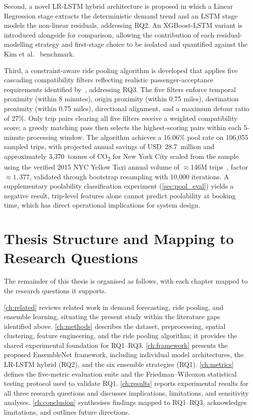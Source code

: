 Second, a novel LR-LSTM hybrid architecture is proposed in which a Linear Regression stage extracts the deterministic demand trend and an LSTM stage models the non-linear residuals, addressing RQ2. An XGBoost-LSTM variant is introduced alongside for comparison, allowing the contribution of each residual-modelling strategy and first-stage choice to be isolated and quantified against the Kim et al.~\parencite{kim2020hybrid} benchmark.

Third, a constraint-aware ride pooling algorithm is developed that applies five cascading compatibility filters reflecting realistic passenger-acceptance requirements identified by~\parencite{furuhata2013ridesharing}, addressing RQ3. The five filters enforce temporal proximity (within 8 minutes), origin proximity (within 0.75 miles), destination proximity (within 0.75 miles), directional alignment, and a maximum detour ratio of 27\%. Only trip pairs clearing all five filters receive a weighted compatibility score; a greedy matching pass then selects the highest-scoring pairs within each 5-minute processing window. The algorithm achieves a 16.06\% pool rate on 106,055 sampled trips, with projected annual savings of USD~28.7~million and approximately 3{,}370~tonnes of CO\textsubscript{2} for New York City scaled from the sample using the verified 2015 NYC Yellow Taxi annual volume of $\approx$146M trips~\parencite{nyc_opendata_2015}, factor $\approx 1{,}377$, validated through bootstrap resampling with 10,000 iterations. A supplementary poolability classification experiment (\autoref{sec:pool_eval}) yields a negative result, trip-level features alone cannot predict poolability at booking time, which has direct operational implications for system design.

\section{Thesis Structure and Mapping to Research Questions}

The remainder of this thesis is organised as follows, with each chapter mapped to the research questions it supports.

\autoref{ch:related} reviews related work in demand forecasting, ride pooling, and ensemble learning, situating the present study within the literature gaps identified above. \autoref{ch:methods} describes the dataset, preprocessing, spatial clustering, feature engineering, and the ride pooling algorithm; it provides the shared experimental foundation for RQ1--RQ3. \autoref{ch:framework} presents the proposed EnsembleNet framework, including individual model architectures, the LR-LSTM hybrid (RQ2), and the six ensemble strategies (RQ1). \autoref{ch:metrics} defines the five-metric evaluation suite and the Friedman--Wilcoxon statistical testing protocol used to validate RQ1. \autoref{ch:results} reports experimental results for all three research questions and discusses implications, limitations, and sensitivity analyses. \autoref{ch:conclusion} synthesises findings mapped to RQ1--RQ3, acknowledges limitations, and outlines future directions.

